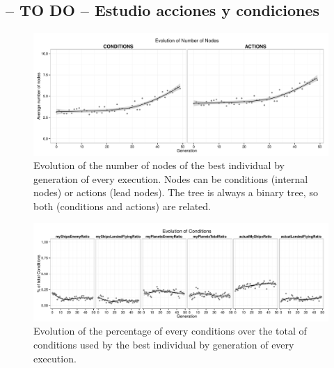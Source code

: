 \documentclass[preprint]{elsarticle}
\begin{document}

\subsection{-- TO DO -- Estudio acciones y condiciones}

 \begin{figure}[ht]
 \begin{center}
   \includegraphics[width=12cm]{nuevas_imgs/estudio_number_nodes.pdf}
 \end{center}
 \caption{Evolution of the number of nodes of the best individual by generation of every execution. Nodes can be conditions (internal nodes) or actions (lead nodes). The tree is always a binary tree, so both (conditions and actions) are related.}
 \label{figura:e_number_nodes}
 \end{figure}

 \begin{figure}[ht]
 \begin{center}
   \includegraphics[width=12cm]{nuevas_imgs/estudio_CONDITIONS.pdf}
 \end{center}
 \caption{Evolution of the percentage of every conditions over the total of conditions used by the best individual by generation of every execution.}
 \label{figura:e_conditions}
 \end{figure}
\end{document}
